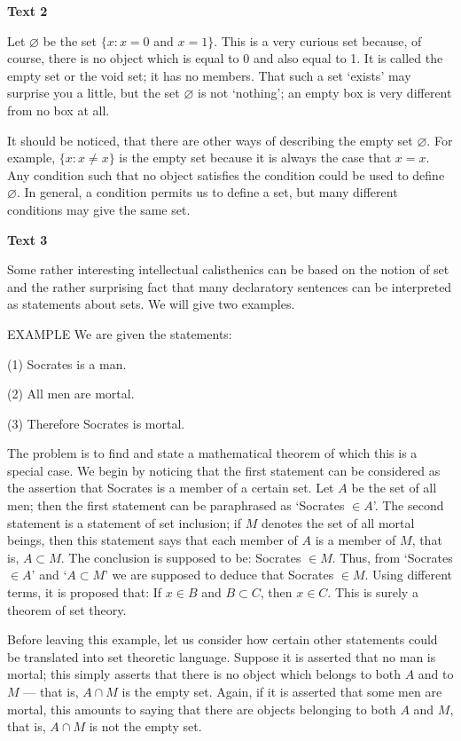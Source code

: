 \documentclass[a4paper]{article}
\newcommand{\ESect}[1]{\medskip\par{\large \textbf{#1}}\par}
\begin{document}
\ESect{Text 2}
Let $\varnothing$ be the set $\{x: x = 0$ and $x = 1\}$. This is a very curious set because, of course, there is no object which
is equal to 0 and also equal to 1. It is called the empty set or the void set; it has no members. That such a set `exists' may
surprise you a little, but the set $\varnothing$ is not `nothing'; an empty box is very different from no box at all.

It should be noticed, that there are other ways of describing the empty set $\varnothing$. For example, $\{x: x \neq x \}$ is
the empty set because it is always the case that $x = x$. Any condition such that no object satisfies the condition could
be used to define $\varnothing$. In general, a condition permits us to define a set, but many different conditions may give
the same set.

\ESect{Text 3}
Some rather interesting intellectual calisthenics can be based on the notion of set and the rather surprising fact that many
declaratory sentences can be interpreted as statements about sets. We will give two examples.

EXAMPLE We are given the statements:

(1) Socrates is a man.

(2) All men are mortal.

(3) Therefore Socrates is mortal.
\medskip

The problem is to find and state a mathematical theorem of which this is a special case. We begin by noticing that the first
statement can be considered as the assertion that Socrates is a member of a certain set. Let $A$ be the set of all men; then
the first statement can be paraphrased as `Socrates $ \in A$'. The second statement is a statement of set inclusion;
if $M$ denotes the set of all mortal beings, then this statement says that each member of $A$ is a member of $M$, that is,
$A \subset M$. The conclusion is supposed to be: Socrates $\in M$. Thus, from `Socrates $\in A$' and `$A \subset M$' we are
supposed to deduce that Socrates $\in M$. Using different terms, it is proposed that: If $x \in B$ and $B \subset C$, then
$x \in C$. This is surely a theorem of set theory.

Before leaving this example, let us consider how certain other statements could be translated into set theoretic language.
Suppose it is asserted that no man is mortal; this simply asserts that there is no object which belongs to both $A$ and to $M$
--- that is, $A \cap M$ is the empty set. Again, if it is asserted that some men are mortal, this amounts to saying that
there are objects belonging to both $A$ and $M$, that is, $A \cap M$ is not the empty set.
\end{document}
